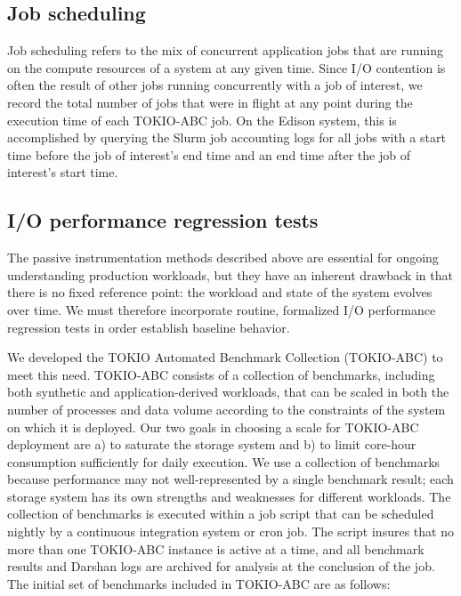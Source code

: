 \subsection{Job scheduling }

Job scheduling refers to the mix of concurrent application jobs that are
running on the compute resources of a system at any given time.  Since I/O contention is often the result of other jobs running concurrently with a job of interest, we record the total number of jobs that were in flight at any point during the execution time of each TOKIO-ABC job.  On the Edison system, this is accomplished by querying the Slurm job accounting logs for all jobs with a start time before the job of interest's end time and an end time after the job of interest's start time.

\subsection{I/O performance regression tests} \label{sec:methods/tests}

The passive instrumentation methods described above are essential for
ongoing understanding production workloads, but they have an inherent
drawback in that there is no fixed reference point: the workload
and state of the system evolves over time.  We must therefore incorporate
routine, formalized I/O performance regression tests in order establish baseline behavior.

We developed the TOKIO Automated Benchmark Collection (TOKIO-ABC) to meet
this need.  TOKIO-ABC consists of a collection of benchmarks, including
both synthetic and application-derived workloads, that can be scaled in
both the number of processes and data volume according to the constraints
of the system on which it is deployed. Our two goals in choosing a scale
for TOKIO-ABC deployment are a) to saturate the storage system and b)
to limit core-hour consumption sufficiently for daily execution.  We use
a collection of benchmarks because performance may not well-represented
by a single benchmark result; each storage system has its own strengths
and weaknesses for different workloads.  The collection of benchmarks is
executed within a job script that can be scheduled nightly by a continuous
integration system or cron job.  The script insures that no more than
one TOKIO-ABC instance is active at a time, and all benchmark results
and Darshan logs are archived for analysis at the conclusion of the job.
The initial set of benchmarks included in TOKIO-ABC are as follows:

